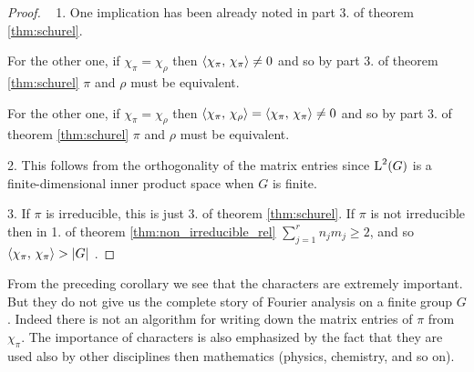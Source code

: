 \begin{proof}~
1. One implication has been already noted in part 3. of theorem \ref{thm:schurel}. 

For the  other one, if $\chi_\pi=\chi_\rho$ then $\braket{\chi_\pi,\, \chi_\pi} \neq 0$ and so by part 3. of theorem \ref{thm:schurel} $\pi$ and $\rho$ must be equivalent.

For the  other one, if $\chi_\pi=\chi_\rho$ then $\braket{\chi_\pi,\, \chi_\rho}=\braket{\chi_\pi,\, \chi_\pi} \neq 0$ and so by part 3. of theorem \ref{thm:schurel} $\pi$ and $\rho$ must be equivalent.

2.  This  follows  from  the orthogonality  of  the matrix  entries  since $\operatorname{L}^{2}(G)$ is a finite-dimensional inner product  space when $G$ is finite.

3. If $\pi$ is irreducible, this is just 3. of theorem \ref{thm:schurel}. If $\pi$ is not irreducible then in 1. of theorem \ref{thm:non_irreducible_rel} $\sum_{j=1}^rn_jm_j\geq 2$, and so  $\braket{\chi_\pi,\, \chi_\pi}>\lvert G\rvert$ .
%
%
\end{proof}
From the preceding corollary we see that the characters are extremely important. But they do not give us the complete  story  of Fourier  analysis on a finite
group $G$. Indeed there is not an algorithm for writing down the matrix entries  of $\pi$ from $\chi_\pi$.
The importance of characters is also emphasized by the fact that they are used also by other disciplines then mathematics (physics, chemistry, and so on).

